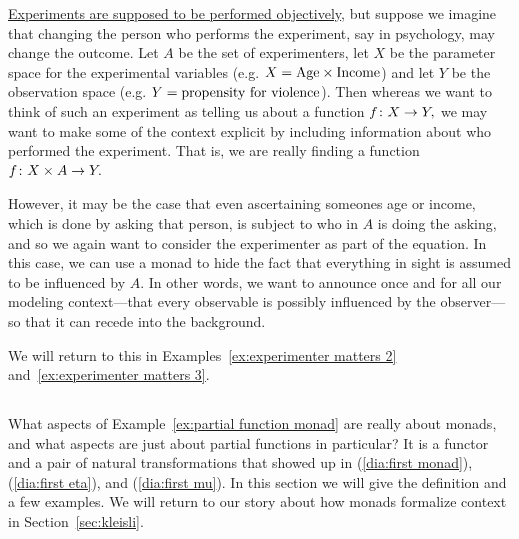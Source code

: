 \documentclass[CT4S-EN-RU]{subfiles}
\begin{document}
\begin{exampleRUS}\label{ex:partial function monad}
\end{exampleRUS}

\begin{applicationENG}\label{app:experimenter matters}
\href{http://en.wikipedia.org/wiki/Observer-expectancy_effect}{\text Experiments are supposed to be performed objectively}, but suppose we imagine that changing the person who performs the experiment, say in psychology, may change the outcome. Let $A$ be the set of experimenters, let $X$ be the parameter space for the experimental variables (e.g. $X=\textnormal{Age}\times\textnormal{Income}$) and let $Y$ be the observation space (e.g. $Y=\textnormal{propensity for violence}$). Then whereas we want to think of such an experiment as telling us about a function $f\colon X\rightarrow Y,$ we may want to make some of the context explicit by including information about who performed the experiment. That is, we are really finding a function $f\colon X\times A\rightarrow Y.$ 

However, it may be the case that even ascertaining someones age or income, which is done by asking that person, is subject to who in $A$ is doing the asking, and so we again want to consider the experimenter as part of the equation. In this case, we can use a monad to hide the fact that everything in sight is assumed to be influenced by $A.$ In other words, we want to announce once and for all our modeling context—that every observable is possibly influenced by the observer—so that it can recede into the background.

We will return to this in Examples~\ref{ex:experimenter matters 2} and~\ref{ex:experimenter matters 3}.
\end{applicationENG}

\begin{applicationRUS}\label{app:experimenter matters}
\end{applicationRUS}


\subsection{}

\begin{blockENG}
What aspects of Example~\ref{ex:partial function monad} are really about monads, and what aspects are just about partial functions in particular? It is a functor and a pair of natural transformations that showed up in (\ref{dia:first monad}), (\ref{dia:first eta}), and (\ref{dia:first mu}). In this section we will give the definition and a few examples. We will return to our story about how monads formalize context in Section~\ref{sec:kleisli}.
\end{blockENG}
\end{document}
